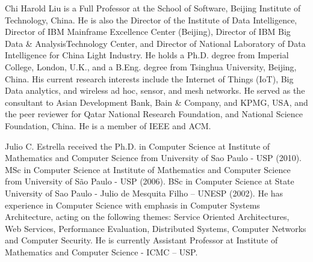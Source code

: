 \documentclass[journal]{IEEEtran}
\begin{document}
\begin{IEEEbiography}{Chi Harold Liu} is a Full Professor at the School of Software, Beijing Institute of Technology, China. He is also the Director of the Institute of Data Intelligence, Director of IBM Mainframe Excellence Center (Beijing), Director of IBM Big Data \& AnalysisTechnology Center, and Director of National Laboratory of Data Intelligence for China Light Industry. He holds a Ph.D. degree from Imperial College, London, U.K., and a B.Eng. degree from Tsinghua University, Beijing, China.  His current research interests include the Internet of Things (IoT), Big Data analytics, and wireless ad hoc, sensor, and mesh networks.  He served as the consultant to Asian Development Bank, Bain \& Company, and KPMG, USA, and the peer reviewer for Qatar National Research Foundation, and National Science Foundation, China. He is a member of IEEE and ACM.

\end{IEEEbiography}


\vspace{-30pt}


\begin{IEEEbiography}{Julio C. Estrella}
 received the Ph.D. in Computer Science at Institute of Mathematics and Computer Science from University of Sao Paulo - USP (2010). MSc in Computer Science at Institute of Mathematics and Computer Science from University of São Paulo - USP (2006). BSc in Computer Science at State University of Sao Paulo -  Julio de Mesquita Filho – UNESP (2002). He has experience in Computer Science with emphasis in Computer Systems Architecture, acting on the following themes: Service Oriented Architectures, Web Services, Performance Evaluation, Distributed Systems, Computer Networks and Computer Security.  He is currently Assistant Professor at Institute of Mathematics and Computer Science - ICMC – USP. 



\end{IEEEbiography}
\end{document}
